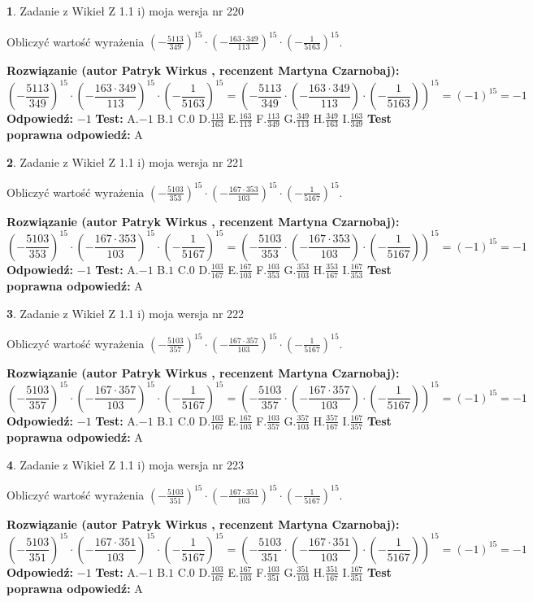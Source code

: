 \documentclass[12pt, a4paper]{article}
\theoremstyle{definition} %
\newtheorem{zad}{}
\newcommand{\zadStart}[1]{\begin{zad}#1\newline}
\newcommand{\zadStop}{\end{zad}}
\newcommand{\rozwStart}[2]{\noindent \textbf{Rozwiązanie (autor #1 , recenzent #2): }\newline}
\newcommand{\rozwStop}{\newline}
\newcommand{\odpStart}{\noindent \textbf{Odpowiedź:}\newline}
\newcommand{\odpStop}{\newline}
\newcommand{\testStart}{\noindent \textbf{Test:}\newline}
\newcommand{\testStop}{\newline}
\newcommand{\kluczStart}{\noindent \textbf{Test poprawna odpowiedź:}\newline}
\newcommand{\kluczStop}{\newline}
\begin{document}
\zadStart{Zadanie z Wikieł Z 1.1 i) moja wersja nr 220}

Obliczyć wartość wyrażenia $(-\frac{5113}{349})^{15} \cdot (-\frac{163 \cdot 349}{113})^{15} \cdot (-\frac{1}{5163})^{15}$.
\zadStop
\rozwStart{Patryk Wirkus}{Martyna Czarnobaj}
$$(-\frac{5113}{349})^{15} \cdot (-\frac{163 \cdot 349}{113})^{15} \cdot (-\frac{1}{5163})^{15} = (-\frac{5113}{349} \cdot (-\frac{163 \cdot 349}{113}) \cdot (-\frac{1}{5163}))^{15} = (-1)^{15} = -1$$
\rozwStop
\odpStart
$-1$
\odpStop
\testStart
A.$-1$ B.$1$ C.$0$ D.$\frac{113}{163}$ E.$\frac{163}{113}$
F.$\frac{113}{349}$ G.$\frac{349}{113}$
H.$\frac{349}{163}$
I.$\frac{163}{349}$
\testStop
\kluczStart
A
\kluczStop



\zadStart{Zadanie z Wikieł Z 1.1 i) moja wersja nr 221}

Obliczyć wartość wyrażenia $(-\frac{5103}{353})^{15} \cdot (-\frac{167 \cdot 353}{103})^{15} \cdot (-\frac{1}{5167})^{15}$.
\zadStop
\rozwStart{Patryk Wirkus}{Martyna Czarnobaj}
$$(-\frac{5103}{353})^{15} \cdot (-\frac{167 \cdot 353}{103})^{15} \cdot (-\frac{1}{5167})^{15} = (-\frac{5103}{353} \cdot (-\frac{167 \cdot 353}{103}) \cdot (-\frac{1}{5167}))^{15} = (-1)^{15} = -1$$
\rozwStop
\odpStart
$-1$
\odpStop
\testStart
A.$-1$ B.$1$ C.$0$ D.$\frac{103}{167}$ E.$\frac{167}{103}$
F.$\frac{103}{353}$ G.$\frac{353}{103}$
H.$\frac{353}{167}$
I.$\frac{167}{353}$
\testStop
\kluczStart
A
\kluczStop



\zadStart{Zadanie z Wikieł Z 1.1 i) moja wersja nr 222}

Obliczyć wartość wyrażenia $(-\frac{5103}{357})^{15} \cdot (-\frac{167 \cdot 357}{103})^{15} \cdot (-\frac{1}{5167})^{15}$.
\zadStop
\rozwStart{Patryk Wirkus}{Martyna Czarnobaj}
$$(-\frac{5103}{357})^{15} \cdot (-\frac{167 \cdot 357}{103})^{15} \cdot (-\frac{1}{5167})^{15} = (-\frac{5103}{357} \cdot (-\frac{167 \cdot 357}{103}) \cdot (-\frac{1}{5167}))^{15} = (-1)^{15} = -1$$
\rozwStop
\odpStart
$-1$
\odpStop
\testStart
A.$-1$ B.$1$ C.$0$ D.$\frac{103}{167}$ E.$\frac{167}{103}$
F.$\frac{103}{357}$ G.$\frac{357}{103}$
H.$\frac{357}{167}$
I.$\frac{167}{357}$
\testStop
\kluczStart
A
\kluczStop



\zadStart{Zadanie z Wikieł Z 1.1 i) moja wersja nr 223}

Obliczyć wartość wyrażenia $(-\frac{5103}{351})^{15} \cdot (-\frac{167 \cdot 351}{103})^{15} \cdot (-\frac{1}{5167})^{15}$.
\zadStop
\rozwStart{Patryk Wirkus}{Martyna Czarnobaj}
$$(-\frac{5103}{351})^{15} \cdot (-\frac{167 \cdot 351}{103})^{15} \cdot (-\frac{1}{5167})^{15} = (-\frac{5103}{351} \cdot (-\frac{167 \cdot 351}{103}) \cdot (-\frac{1}{5167}))^{15} = (-1)^{15} = -1$$
\rozwStop
\odpStart
$-1$
\odpStop
\testStart
A.$-1$ B.$1$ C.$0$ D.$\frac{103}{167}$ E.$\frac{167}{103}$
F.$\frac{103}{351}$ G.$\frac{351}{103}$
H.$\frac{351}{167}$
I.$\frac{167}{351}$
\testStop
\kluczStart
A
\kluczStop
\end{document}
